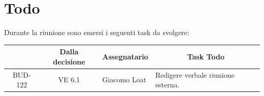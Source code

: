 

\section{Todo}

Durante la riunione sono emersi i seguenti task da svolgere:

\vspace{0.5cm}

\begin{table}[htbp]
\centering
{}
\begin{tabular}{|c|c|p{}|p{}|}
    \hline
    \rowcolor[gray]{0.75}
    \multicolumn{1}{|c|}{\textbf{Codice}} & \multicolumn{1}{|c|}{\textbf{Dalla decisione}} & \multicolumn{1}{|c|}{\textbf{Assegnatario}} & \multicolumn{1}{|c|}{\textbf{Task Todo}} \\
    \hline
    BUD-122 & VE 6.1 & Giacomo Loat & Redigere verbale riunione esterna. \\
    \hline
\end{tabular}
\end{table}

